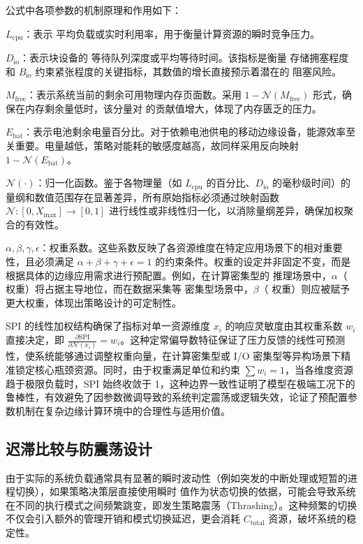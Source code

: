 公式中各项参数的机制原理和作用如下：

$L_{\text{cpu}}$：表示  平均负载或实时利用率，用于衡量计算资源的瞬时竞争压力。

$D_{\text{io}}$：表示块设备的  等待队列深度或平均等待时间。该指标是衡量  存储拥塞程度和 $B_{\text{io}}$ 约束紧张程度的关键指标，其数值的增长直接预示着潜在的  阻塞风险。

$M_{\text{free}}$：表示系统当前的剩余可用物理内存页面数。采用 $1 - \mathcal{N}(M_{\text{free}})$ 形式，确保在内存剩余量低时，该分量对  的贡献值增大，体现了内存匮乏的压力。

$E_{\text{bat}}$：表示电池剩余电量百分比。对于依赖电池供电的移动边缘设备，能源效率至关重要。电量越低，策略对能耗的敏感度越高，故同样采用反向映射 $1 - \mathcal{N}(E_{\text{bat}})$。

$\mathcal{N}(\cdot)$：归一化函数。鉴于各物理量（如 $L_{\text{cpu}}$ 的百分比、$D_{\text{io}}$ 的毫秒级时间）的量纲和数值范围存在显著差异，所有原始指标必须通过映射函数 $\mathcal{N}: [0, X_{\max}] \to [0, 1]$ 进行线性或非线性归一化，以消除量纲差异，确保加权聚合的有效性。

$\alpha, \beta, \gamma, \epsilon$：权重系数。这些系数反映了各资源维度在特定应用场景下的相对重要性，且必须满足 $\alpha + \beta + \gamma + \epsilon = 1$ 的约束条件。权重的设定并非固定不变，而是根据具体的边缘应用需求进行预配置。例如，在计算密集型的  推理场景中，$\alpha$（ 权重）将占据主导地位，而在数据采集等  密集型场景中，$\beta$（ 权重）则应被赋予更大权重，体现出策略设计的可定制性。

SPI 的线性加权结构确保了指标对单一资源维度 $x_i$ 的响应灵敏度由其权重系数 $w_i$ 直接决定，即 $\frac{\partial \text{SPI}}{\partial \mathcal{N}(x_i)} = w_i$。这种定常偏导数特征保证了压力反馈的线性可预测性，使系统能够通过调整权重向量，在计算密集型或 I/O 密集型等异构场景下精准锁定核心瓶颈资源。同时，由于权重满足单位和约束 $\sum w_i = 1$，当各维度资源趋于极限负载时，SPI 始终收敛于 1，这种边界一致性证明了模型在极端工况下的鲁棒性，有效避免了因参数微调导致的系统判定震荡或逻辑失效，论证了预配置参数机制在复杂边缘计算环境中的合理性与适用价值。

\subsection{迟滞比较与防震荡设计}

由于实际的系统负载通常具有显著的瞬时波动性（例如突发的中断处理或短暂的进程切换），如果策略决策层直接使用瞬时  值作为状态切换的依据，可能会导致系统在不同的执行模式之间频繁跳变，即发生策略震荡（Thrashing）。这种频繁的切换不仅会引入额外的管理开销和模式切换延迟，更会消耗 $C_{\text{total}}$ 资源，破坏系统的稳定性。

